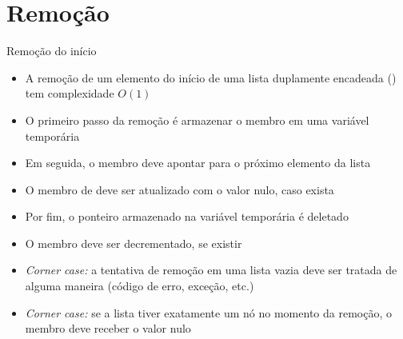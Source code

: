 \section{Remoção}

\begin{frame}[fragile]{Remoção do início}

    \begin{itemize}
        \item A remoção de um elemento do início de uma lista duplamente encadeada
        () tem complexidade $O(1)$

        \item O primeiro passo da remoção é armazenar o membro  em uma 
            variável temporária

        \item Em seguida, o membro  deve apontar para o próximo elemento da
            lista

        \item O membro  de  deve ser atualizado com o valor nulo,
            caso exista

        \item Por fim, o ponteiro armazenado na variável temporária é deletado

        \item O membro  deve ser decrementado, se existir

        \item \textit{Corner case:} a tentativa de remoção em uma lista vazia deve ser tratada
            de alguma maneira (código de erro, exceção, etc.)

        \item \textit{Corner case:} se a lista tiver exatamente um nó no momento da remoção,
            o membro  deve receber o valor nulo
    \end{itemize}

\end{frame}

